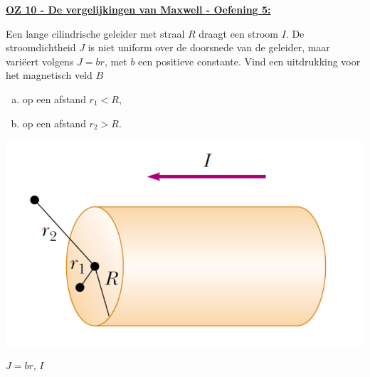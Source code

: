 \textbf{\underline{OZ 10 - De vergelijkingen van Maxwell - Oefening 5:}}
\vspace{0.5cm}

\begin{minipage}{.73\textwidth}
    Een lange cilindrische geleider met straal $R$ draagt een stroom $I$. De stroomdichtheid $J$ is niet uniform over de doorsnede van de geleider, maar variëert volgens $J = br$, met $b$ een positieve constante. Vind een uitdrukking voor het magnetisch veld $B$
    \begin{enumerate}[(a)]
        \item op een afstand $r_1 < R$,
        \item op een afstand $r_2 > R$.
    \end{enumerate}
\end{minipage}
\begin{minipage}{.23\textwidth}
    \begin{center}
        \includegraphics[scale = 0.4]{oz10/resources/Oz10Oef5.png}
    \end{center}
\end{minipage}

\begin{description}[labelwidth=1.5cm, leftmargin=!]
    \item[Geg. :]  $J = br$, $I$
\end{description}

